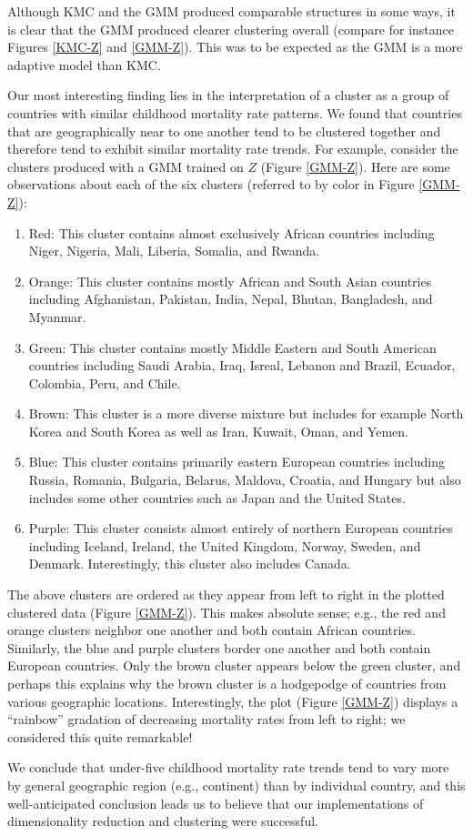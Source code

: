 \documentclass[12pt]{article}
\begin{document}
Although KMC and the GMM produced comparable structures in some ways, it is clear that the GMM produced clearer clustering overall (compare for instance Figures \ref{KMC-Z} and \ref{GMM-Z}). This was to be expected as the GMM is a more adaptive model than KMC.

Our most interesting finding lies in the interpretation of a cluster as a group of countries with similar childhood mortality rate patterns. We found that countries that are geographically near to one another tend to be clustered together and therefore tend to exhibit similar mortality rate trends. For example, consider the clusters produced with a GMM trained on $Z$ (Figure \ref{GMM-Z}). Here are some observations about each of the six clusters (referred to by color in Figure \ref{GMM-Z}):
\begin{enumerate}
\item Red: This cluster contains almost exclusively African countries including Niger, Nigeria, Mali, Liberia, Somalia, and Rwanda.
\item Orange: This cluster contains mostly African and South Asian countries including Afghanistan, Pakistan, India, Nepal, Bhutan, Bangladesh, and Myanmar.
\item Green: This cluster contains mostly Middle Eastern and South American countries including Saudi Arabia, Iraq, Isreal, Lebanon and Brazil, Ecuador, Colombia, Peru, and Chile.
\item Brown: This cluster is a more diverse mixture but includes for example North Korea and South Korea as well as Iran, Kuwait, Oman, and Yemen.
\item Blue: This cluster contains primarily eastern European countries including Russia, Romania, Bulgaria, Belarus, Maldova, Croatia, and Hungary but also includes some other countries such as Japan and the United States.
\item Purple: This cluster consists almost entirely of northern European countries including Iceland, Ireland, the United Kingdom, Norway, Sweden, and Denmark. Interestingly, this cluster also includes Canada.
\end{enumerate}
The above clusters are ordered as they appear from left to right in the plotted clustered data (Figure \ref{GMM-Z}). This makes absolute sense; e.g., the red and orange clusters neighbor one another and both contain African countries. Similarly, the blue and purple clusters border one another and both contain European countries. Only the brown cluster appears below the green cluster, and perhaps this explains why the brown cluster is a hodgepodge of countries from various geographic locations. Interestingly, the plot (Figure \ref{GMM-Z}) displays a ``rainbow'' gradation of decreasing mortality rates from left to right; we considered this quite remarkable!

We conclude that under-five childhood mortality rate trends tend to vary more by general geographic region (e.g., continent) than by individual country, and this well-anticipated conclusion leads us to believe that our implementations of dimensionality reduction and clustering were successful.
\end{document}
